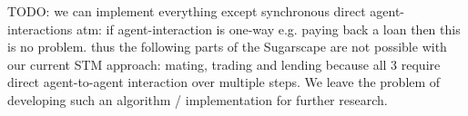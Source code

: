 TODO: 
we can implement everything except synchronous direct agent-interactions atm: if agent-interaction is one-way e.g. paying back a loan then this is no problem. thus the following parts of the Sugarscape are not possible with our current STM approach: mating, trading and lending  because all 3 require direct agent-to-agent interaction over multiple steps. We leave the problem of developing such an algorithm / implementation for further research.